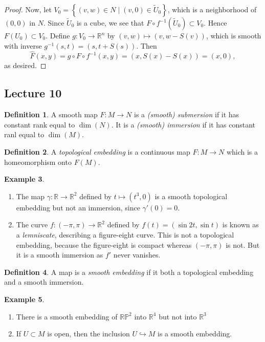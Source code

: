 \documentclass[10pt,letterpaper,cm]{nupset}
\theoremstyle{definition}
\newtheorem{definition}{Definition}[subsection]
\newtheorem{exmp}[definition]{Example}
\theoremstyle{theorem}
\theoremstyle{remark}
\newcommand{\R}{\mathbb R}
\newcommand{\RP}{\mathbb{RP}}
\newcommand{\1}{\mathbf{1}}
\newcommand{\0}{\vec 0}
\begin{document}
\begin{proof}
\medskip

 Now, let $V_0 = \left\{(v,w) \in N \mid (v,0)\in \widetilde{U}_0\right\}$, which is a neighborhood of $(0,0)$ in  $N$. Since $\widetilde{U}_0$ is a cube, we see that $F \circ f^{-1}(\widetilde{U}_0) \subset V_0$. Hence $F(U_0) \subset V_0$.  Define $g : V_0 \to \R^n$ by $(v,w) \mapsto (v, w-S(v))$, which is smooth with inverse $g^{-1}(s,t) = (s, t + S(s))$. Then $$\widehat{F}(x,y) = g \circ F \circ f^{-1}(x,y) = (x, S(x) - S(x)) = (x,0),$$ as desired.
\end{proof}

\subsection{Lecture 10}

\begin{definition}
A smooth map $F: M \to N$ is a \textit{(smooth) submersion} if it has constant rank equal to $\dim(N)$. It is a \textit{(smooth) immersion} if it has constant ranl equal to $\dim(M)$.
\end{definition}

\begin{definition}
A \textit{topological embedding} is a continuous map $F: M \to N$ which is a homeomorphism onto $F(M)$.
\end{definition}

\begin{exmp} $ $
\begin{enumerate}
\item The map $\gamma: \R \to \R^2$ defined by $t\mapsto \left(t^3, 0\right)$ is a smooth topological embedding but not an immersion, since $\gamma'(0) =0$.
\item The curve $f: \left({-\pi}, \pi\right) \to \R^2$ defined by $f(t) = \left(\sin 2t , \sin t\right)$ is known as a \textit{lemniscate}, describing a figure-eight curve. This is not a topological embedding, because the figure-eight is compact whereas $\left({-\pi}, \pi\right)$ is not. But it is a smooth immersion as $f'$ never vanishes. 
\end{enumerate}
\end{exmp}

\begin{definition}
A map is a \textit{smooth embedding} if it both a topological embedding and a smooth immersion.
\end{definition}

\begin{exmp} $ $
\begin{enumerate}
\item There is a smooth embedding of $\RP^2$ into $\R^4$ but not into $\R^3$
\item If $U \subset M$ is open, then the inclusion $U \hookrightarrow M$ is a smooth embedding.
\end{enumerate}
\end{exmp}
\end{document}
